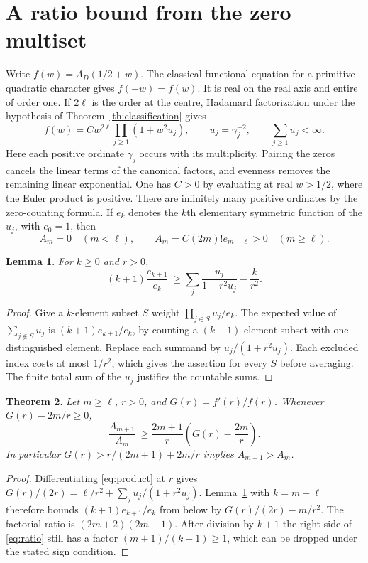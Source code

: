 \documentclass[11pt]{article}
\newtheorem{theorem}{Theorem}
\newtheorem{lemma}[theorem]{Lemma}
\newcommand{\LL}{\Lambda}
\numberwithin{equation}{section}
\begin{document}
\section{A ratio bound from the zero multiset}
Write $f(w)=\LL_D(1/2+w)$. The classical functional equation for a primitive quadratic character gives $f(-w)=f(w)$. It is real on the real axis and entire of order one. If $2\ell$ is the order at the centre, Hadamard factorization under the hypothesis of Theorem~\ref{th:classification} gives
\begin{equation}\label{eq:product}
 f(w)=C w^{2\ell}\prod_{j\ge1}(1+w^2 u_j),
 \qquad u_j=\gamma_j^{-2},\qquad \sum_{j\ge1}u_j<\infty .
\end{equation}
Here each positive ordinate $\gamma_j$ occurs with its multiplicity. Pairing the zeros cancels the linear terms of the canonical factors, and evenness removes the remaining linear exponential. One has $C>0$ by evaluating at real $w>1/2$, where the Euler product is positive. There are infinitely many positive ordinates by the zero-counting formula. If $e_k$ denotes the $k$th elementary symmetric function of the $u_j$, with $e_0=1$, then
\[
 A_m=0\quad(m<\ell),\qquad A_m=C(2m)!e_{m-\ell}>0\quad(m\ge\ell).
\]

\begin{lemma}\label{lem:subsets}
For $k\ge0$ and $r>0$,
\[
 (k+1)\frac{e_{k+1}}{e_k}\ \ge \sum_j\frac{u_j}{1+r^2u_j}-\frac{k}{r^2}.
\]
\end{lemma}
\begin{proof}
Give a $k$-element subset $S$ weight $\prod_{j\in S}u_j/e_k$. The expected value of $\sum_{j\notin S}u_j$ is $(k+1)e_{k+1}/e_k$, by counting a $(k+1)$-element subset with one distinguished element. Replace each summand by $u_j/(1+r^2u_j)$. Each excluded index costs at most $1/r^2$, which gives the assertion for every $S$ before averaging. The finite total sum of the $u_j$ justifies the countable sums.
\end{proof}

\begin{theorem}\label{th:ratio}
Let $m\ge\ell$, $r>0$, and $G(r)=f'(r)/f(r)$. Whenever $G(r)-2m/r\ge0$,
\begin{equation}\label{eq:ratio}
 \frac{A_{m+1}}{A_m}\ \ge \frac{2m+1}{r}\left(G(r)-\frac{2m}{r}\right).
\end{equation}
In particular $G(r)>r/(2m+1)+2m/r$ implies $A_{m+1}>A_m$.
\end{theorem}
\begin{proof}
Differentiating \eqref{eq:product} at $r$ gives
$G(r)/(2r)=\ell/r^2+\sum_j u_j/(1+r^2u_j)$.
Lemma~\ref{lem:subsets} with $k=m-\ell$ therefore bounds $(k+1)e_{k+1}/e_k$ from below by $G(r)/(2r)-m/r^2$. The factorial ratio is $(2m+2)(2m+1)$. After division by $k+1$ the right side of \eqref{eq:ratio} still has a factor $(m+1)/(k+1)\ge1$, which can be dropped under the stated sign condition.
\end{proof}
\end{document}
